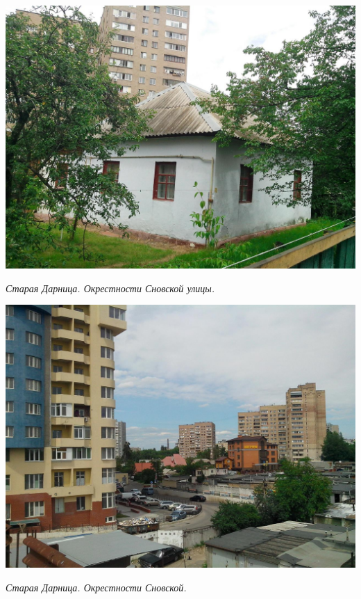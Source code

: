 \begin{center}
\includegraphics[width=0.95\linewidth]{lpix/IMG_20160613_141059.jpg}

\textit{Старая Дарница. Окрестности Сновской улицы.}
\end{center}


\begin{center}
\includegraphics[width=0.95\linewidth]{lpix/IMG_20160613_141738.jpg}

\textit{Старая Дарница. Окрестности Сновской.}
\end{center}


